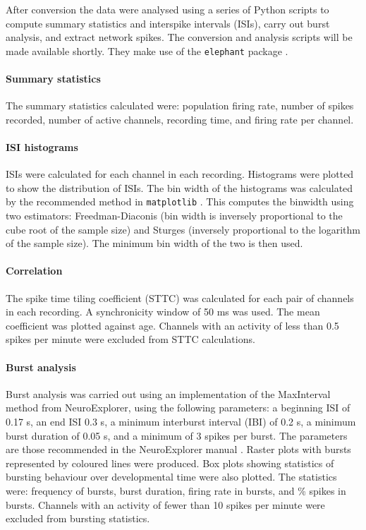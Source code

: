 \documentclass[10pt]{article}
\begin{document}
\par After conversion the data were analysed using a series of Python scripts to compute summary statistics and interspike intervals (ISIs), carry out burst analysis, and extract network spikes. The conversion and analysis scripts will be made available shortly. They make use of the \texttt{elephant} package \cite{elephant_authors_and_contributors_elephant_2020}.

\paragraph{Summary statistics} The summary statistics calculated were: population firing rate, number of spikes recorded, number of active channels, recording time, and firing rate per channel.

\paragraph{ISI histograms} ISIs were calculated for each channel in each recording. Histograms were plotted to show the distribution of ISIs. The bin width of the histograms was calculated by the recommended method in \texttt{matplotlib} \cite{the_scipy_community_numpyhistogram_bin_edges_2020}. This computes the binwidth using two estimators: Freedman-Diaconis (bin width is inversely proportional to the cube root of the sample size) and Sturges (inversely proportional to the logarithm of the sample size). The minimum bin width of the two is then used.

\paragraph{Correlation} The spike time tiling coefficient (STTC) \cite{cutts_detecting_2014} was calculated for each pair of channels in each recording. A synchronicity window of 50 ms was used. The mean coefficient was plotted against age. Channels with an activity of less than 0.5 spikes per minute were excluded from STTC calculations.

\paragraph{Burst analysis} Burst analysis was carried out using an implementation of the MaxInterval method from NeuroExplorer, using the following parameters: a beginning ISI of 0.17 s, an end ISI 0.3 s, a minimum interburst interval (IBI) of 0.2 s, a minimum burst duration of 0.05 s, and a minimum of 3 spikes per burst. The parameters are those recommended in the NeuroExplorer manual \cite{nex_technologies_neuroexplorer_2020}. Raster plots with bursts represented by coloured lines were produced. Box plots showing statistics of bursting behaviour over developmental time were also plotted. The statistics were: frequency of bursts, burst duration, firing rate in bursts, and \% spikes in bursts. Channels with an activity of fewer than 10 spikes per minute were excluded from bursting statistics.
\end{document}
